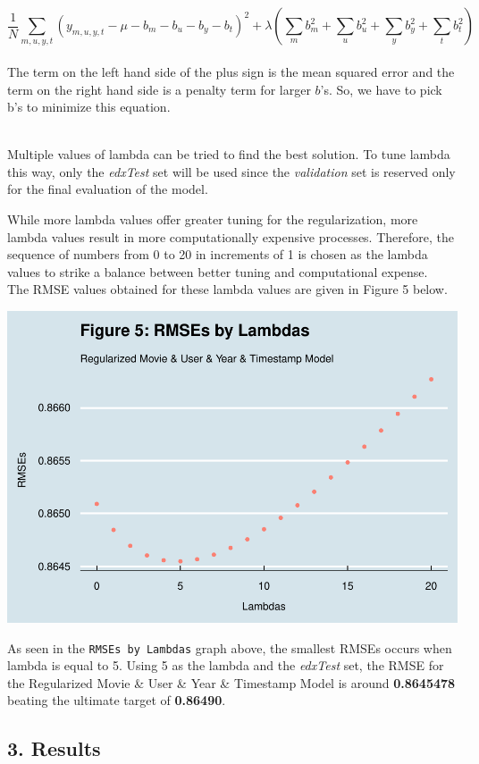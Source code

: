 \documentclass[
]{article}
\begin{document}
\[\frac{1}{N} \sum_{m, u, y, t} (y_{m, u, y, t} - \mu - b_m - b_u - b_y - b_t)^2 + \lambda(\sum_{m}b_m^2 + \sum_{u}b_u^2 + \sum_{y}b_y^2 + \sum_{t}b_t^2)\]\\
The term on the left hand side of the plus sign is the mean squared
error and the term on the right hand side is a penalty term for larger
\(b\)'s. So, we have to pick b's to minimize this equation.\\
\strut \\
Multiple values of lambda can be tried to find the best solution. To
tune lambda this way, only the \emph{edxTest} set will be used since the
\emph{validation} set is reserved only for the final evaluation of the
model.

While more lambda values offer greater tuning for the regularization,
more lambda values result in more computationally expensive processes.
Therefore, the sequence of numbers from 0 to 20 in increments of 1 is
chosen as the lambda values to strike a balance between better tuning
and computational expense.\\
The RMSE values obtained for these lambda values are given in Figure 5
below.

\begin{center}\includegraphics[width=0.75\linewidth,height=0.5\textheight]{MovieLens_Project_files/figure-latex/Plot - RMSEs by Lambdas-1} \end{center}

As seen in the \texttt{RMSEs\ by\ Lambdas} graph above, the smallest
RMSEs occurs when lambda is equal to 5. Using 5 as the lambda and the
\emph{edxTest} set, the RMSE for the Regularized Movie \& User \& Year
\& Timestamp Model is around \textbf{0.8645478} beating the ultimate
target of \textbf{0.86490}.

\hypertarget{results}{%
\subsection{3. Results}\label{results}}
\end{document}
